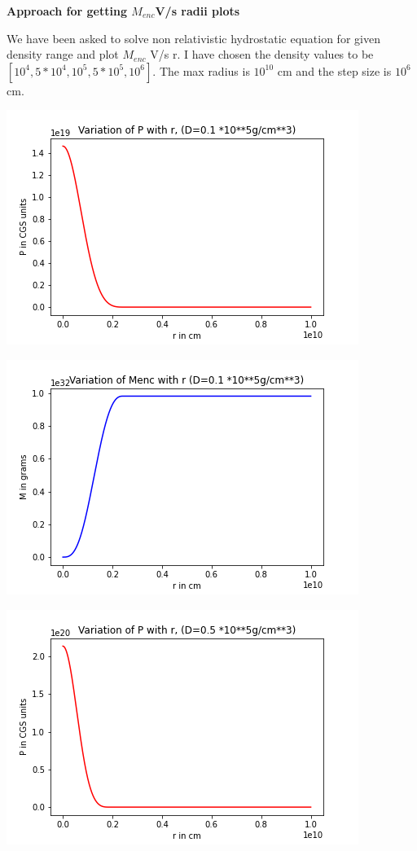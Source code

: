 \documentclass{article}
\begin{document}
  
 \textbf{Approach for getting $M_{enc}$V/s radii plots}

 
 We have been asked to solve non relativistic hydrostatic equation for given density range and plot $M_{enc}$ V/s r. I have chosen the density values to be $[10^{4}, 5*10^{4}, 10^{5}, 5*10^{5},10^{6}]$. The max radius is $10^{10}$ cm and the step size is $10^{6} $cm. 
 
 \begin{center}
\begin{multicols}{2}
	\begin{center}
        \includegraphics[scale=0.3]{Images/Pr_pb1_0}
        \end{center}
\columnbreak
       \includegraphics[scale=0.3]{Images/Mr_pb1_0}
\end{multicols}
\begin{multicols}{2}
	\begin{center}
        \includegraphics[scale=0.3]{Images/Pr_pb1_1}

\end{center}
\end{multicols}
\end{center}
\end{document}
